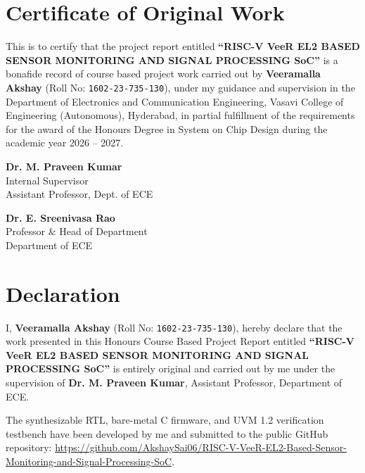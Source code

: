 \documentclass[12pt,a4paper,oneside]{report}
\begin{document}
\setcounter{page}{2}

\chapter*{Certificate of Original Work}
This is to certify that the project report entitled \textbf{``RISC-V VeeR EL2 BASED SENSOR MONITORING AND SIGNAL PROCESSING SoC''} is a bonafide record of course based project work carried out by \textbf{Veeramalla Akshay} (Roll No: \texttt{1602-23-735-130}), under my guidance and supervision in the Department of Electronics and Communication Engineering, Vasavi College of Engineering (Autonomous), Hyderabad, in partial fulfillment of the requirements for the award of the Honours Degree in System on Chip Design during the academic year 2026 -- 2027.

\vspace{3cm}
\noindent
\begin{minipage}{0.45\textwidth}
    \textbf{Dr. M. Praveen Kumar}\\
    Internal Supervisor\\
    Assistant Professor, Dept. of ECE
\end{minipage}
\hfill
\begin{minipage}{0.45\textwidth}
    \raggedleft
    \textbf{Dr. E. Sreenivasa Rao}\\
    Professor \& Head of Department\\
    Department of ECE
\end{minipage}

\newpage
\chapter*{Declaration}
I, \textbf{Veeramalla Akshay} (Roll No: \texttt{1602-23-735-130}), hereby declare that the work presented in this Honours Course Based Project Report entitled \textbf{``RISC-V VeeR EL2 BASED SENSOR MONITORING AND SIGNAL PROCESSING SoC''} is entirely original and carried out by me under the supervision of \textbf{Dr. M. Praveen Kumar}, Assistant Professor, Department of ECE. 

The synthesizable RTL, bare-metal C firmware, and UVM 1.2 verification testbench have been developed by me and submitted to the public GitHub repository:
\url{https://github.com/AkshaySai06/RISC-V-VeeR-EL2-Based-Sensor-Monitoring-and-Signal-Processing-SoC}.
\end{document}
